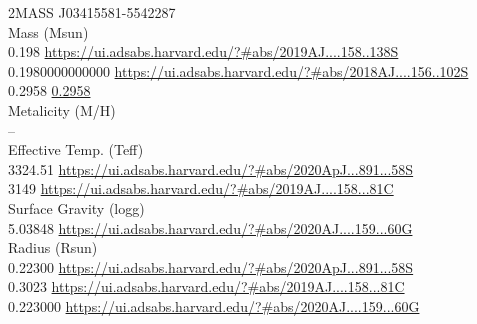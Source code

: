 2MASS J03415581-5542287\\
Mass (Msun)\\
0.198 \url{https://ui.adsabs.harvard.edu/?#abs/2019AJ....158..138S}\\
0.1980000000000 \url{https://ui.adsabs.harvard.edu/?#abs/2018AJ....156..102S}\\
0.2958 \url{0.2958}\\
Metalicity (M/H)\\
--\\
Effective Temp. (Teff)\\
3324.51 \url{https://ui.adsabs.harvard.edu/?#abs/2020ApJ...891...58S}\\
3149 \url{https://ui.adsabs.harvard.edu/?#abs/2019AJ....158...81C}\\
Surface Gravity (logg)\\
5.03848 \url{https://ui.adsabs.harvard.edu/?#abs/2020AJ....159...60G}\\
Radius (Rsun)\\
0.22300 \url{https://ui.adsabs.harvard.edu/?#abs/2020ApJ...891...58S}\\
0.3023 \url{https://ui.adsabs.harvard.edu/?#abs/2019AJ....158...81C}\\
0.223000 \url{https://ui.adsabs.harvard.edu/?#abs/2020AJ....159...60G}\\